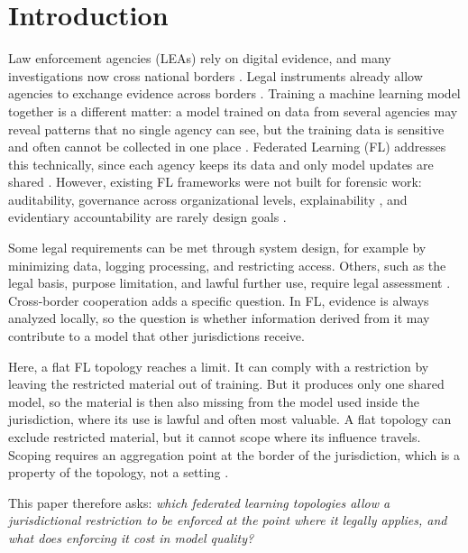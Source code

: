 \section{Introduction}
\label{sec:introduction}

Law enforcement agencies (LEAs) rely on digital evidence, and many investigations now cross national borders \citep{hargreaves2024dfpulse}. Legal instruments already allow agencies to exchange evidence across borders \citep{eio2014,eevidence2023, reviewOfreview}. Training a machine learning model together is a different matter: a model trained on data from several agencies may reveal patterns that no single agency can see, but the training data is sensitive and often cannot be collected in one place \citep{scanlon2023chatgpt,breitinger2023sharing}. Federated Learning (FL) addresses this technically, since each agency keeps its data and only model updates are shared \citep{mcmahan2017communication}. However, existing FL frameworks were not built for forensic work: auditability, governance across organizational levels, explainability \citep{solanke2022explainable}, and evidentiary accountability are rarely design goals \citep{riedel2024comparative}.

Some legal requirements can be met through system design, for example by minimizing data, logging processing, and restricting access. Others, such as the legal basis, purpose limitation, and lawful further use, require legal assessment \citep{directive2016680,TeMolder2023}. Cross-border cooperation adds a specific question. In FL, evidence is always analyzed locally, so the question is whether information derived from it may contribute to a model that other jurisdictions receive.

Here, a flat FL topology reaches a limit. It can comply with a restriction by leaving the restricted material out of training. But it produces only one shared model, so the material is then also missing from the model used inside the jurisdiction, where its use is lawful and often most valuable. A flat topology can exclude restricted material, but it cannot scope where its influence travels. Scoping requires an aggregation point at the border of the jurisdiction, which is a property of the topology, not a setting \citep{9148862}.

This paper therefore asks: \emph{which federated learning topologies allow a jurisdictional restriction to be enforced at the point where it legally applies, and what does enforcing it cost in model quality?}

